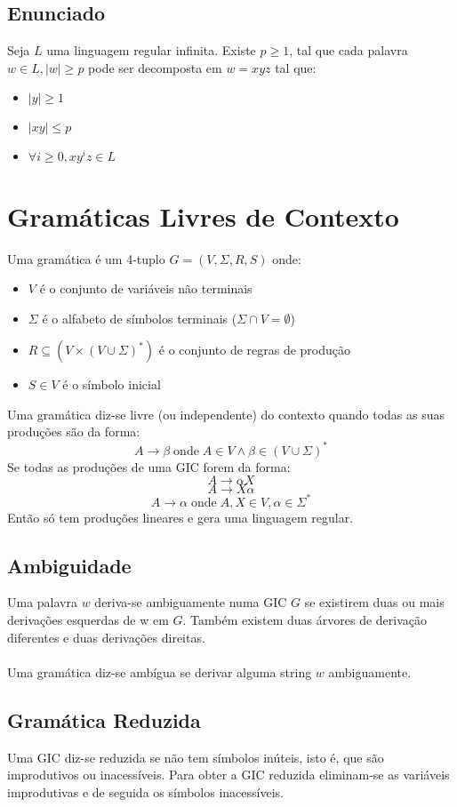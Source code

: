 \documentclass[10pt,a4paper]{report}
\begin{document}
\subsection{Enunciado}
Seja $L$ uma linguagem regular infinita. Existe $p \geq 1$, tal que cada palavra $w \in L, |w| \geq p$ pode ser decomposta em $w = xyz$ tal que:
\begin{itemize}
\item $|y| \geq 1$
\item $|xy| \leq p$
\item $\forall i \geq 0, xy^iz \in L$
\end{itemize} 

\section{Gramáticas Livres de Contexto}
Uma gramática é um 4-tuplo $G = (V,\Sigma, R, S)$ onde:
\begin{itemize}
\item $V$ é o conjunto de variáveis não terminais
\item $\Sigma$ é o alfabeto de símbolos terminais ($\Sigma \cap V = \emptyset$)
\item $R \subseteq (V \times (V \cup \Sigma)^*)$ é o conjunto de regras de produção
\item $S \in V$ é o símbolo inicial
\end{itemize}
Uma gramática diz-se livre (ou independente) do contexto quando todas as suas produções são da forma:
$$
A \rightarrow \beta \; \text{onde} \; A \in V \land \beta \in (V\cup \Sigma)^*
$$
Se todas as produções de uma GIC forem da forma:
$$
A \rightarrow \alpha X
$$
$$
A \rightarrow X \alpha
$$
$$
A \rightarrow \alpha \; \text{onde} \; A, X \in V, \alpha \in \Sigma^*
$$
Então só tem produções lineares e gera uma linguagem regular.
\subsection{Ambiguidade}
Uma palavra $w$ deriva-se ambiguamente numa GIC $G$ se existirem duas ou mais derivações esquerdas de w em $G$. Também existem duas árvores de derivação diferentes e duas derivações direitas.\\
\\
Uma gramática diz-se ambígua se derivar alguma string $w$ ambiguamente.
\subsection{Gramática Reduzida}
Uma GIC diz-se reduzida se não tem símbolos  inúteis, isto é, que são improdutivos ou inacessíveis. Para obter a GIC reduzida eliminam-se as variáveis improdutivas e de seguida os símbolos inacessíveis.
\end{document}
